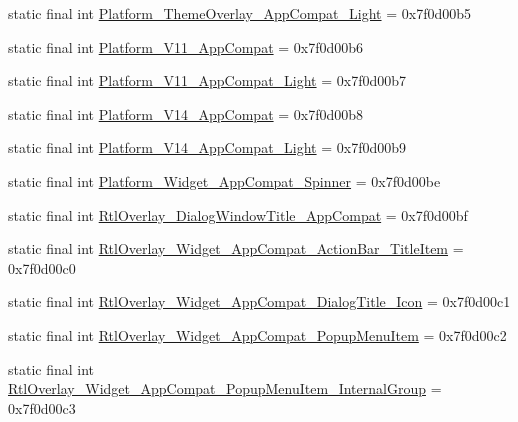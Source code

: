 \begin{DoxyCompactItemize}
\item 
static final int \mbox{\hyperlink{classcom_1_1google_1_1android_1_1gms_1_1R_1_1style_a03ccb9c022aee5399b07428c7badec64}{Platform\+\_\+\+Theme\+Overlay\+\_\+\+App\+Compat\+\_\+\+Light}} = 0x7f0d00b5
\item 
static final int \mbox{\hyperlink{classcom_1_1google_1_1android_1_1gms_1_1R_1_1style_a30b7f4c84e63fadb7fa299df8f15d177}{Platform\+\_\+\+V11\+\_\+\+App\+Compat}} = 0x7f0d00b6
\item 
static final int \mbox{\hyperlink{classcom_1_1google_1_1android_1_1gms_1_1R_1_1style_a93f184e7f28cac1fc2fcd41c72469135}{Platform\+\_\+\+V11\+\_\+\+App\+Compat\+\_\+\+Light}} = 0x7f0d00b7
\item 
static final int \mbox{\hyperlink{classcom_1_1google_1_1android_1_1gms_1_1R_1_1style_ae9e7024a81d021c74c4105e6c777c6fb}{Platform\+\_\+\+V14\+\_\+\+App\+Compat}} = 0x7f0d00b8
\item 
static final int \mbox{\hyperlink{classcom_1_1google_1_1android_1_1gms_1_1R_1_1style_af31f20e79408605f5490a25a22a4f39e}{Platform\+\_\+\+V14\+\_\+\+App\+Compat\+\_\+\+Light}} = 0x7f0d00b9
\item 
static final int \mbox{\hyperlink{classcom_1_1google_1_1android_1_1gms_1_1R_1_1style_a391cbeef96dca7824bd93c9d5ee3e8f3}{Platform\+\_\+\+Widget\+\_\+\+App\+Compat\+\_\+\+Spinner}} = 0x7f0d00be
\item 
static final int \mbox{\hyperlink{classcom_1_1google_1_1android_1_1gms_1_1R_1_1style_a7092c2a01b1c16260e3a14abb8e23b7e}{Rtl\+Overlay\+\_\+\+Dialog\+Window\+Title\+\_\+\+App\+Compat}} = 0x7f0d00bf
\item 
static final int \mbox{\hyperlink{classcom_1_1google_1_1android_1_1gms_1_1R_1_1style_a587221a5bea7361a66b7279eb625c4a5}{Rtl\+Overlay\+\_\+\+Widget\+\_\+\+App\+Compat\+\_\+\+Action\+Bar\+\_\+\+Title\+Item}} = 0x7f0d00c0
\item 
static final int \mbox{\hyperlink{classcom_1_1google_1_1android_1_1gms_1_1R_1_1style_a9adf60e3d2ecebd224fe4c6142c5a453}{Rtl\+Overlay\+\_\+\+Widget\+\_\+\+App\+Compat\+\_\+\+Dialog\+Title\+\_\+\+Icon}} = 0x7f0d00c1
\item 
static final int \mbox{\hyperlink{classcom_1_1google_1_1android_1_1gms_1_1R_1_1style_ac0b5426bc089245c88695582141ec37a}{Rtl\+Overlay\+\_\+\+Widget\+\_\+\+App\+Compat\+\_\+\+Popup\+Menu\+Item}} = 0x7f0d00c2
\item 
static final int \mbox{\hyperlink{classcom_1_1google_1_1android_1_1gms_1_1R_1_1style_a90018980dd508d506cb04f85f5a82228}{Rtl\+Overlay\+\_\+\+Widget\+\_\+\+App\+Compat\+\_\+\+Popup\+Menu\+Item\+\_\+\+Internal\+Group}} = 0x7f0d00c3

\end{DoxyCompactItemize}
